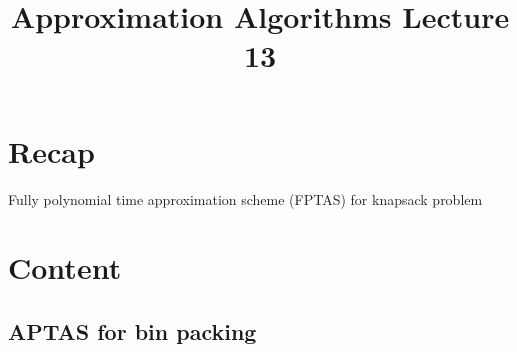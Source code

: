 \documentclass[a4paper]{article}
\title{\textbf{Approximation Algorithms Lecture 13}}
\date{}
\begin{document}
\maketitle
\tableofcontents

\section{Recap}

Fully polynomial time approximation scheme (FPTAS) for knapsack problem

\section{Content}

\subsection{APTAS for bin packing}
\end{document}
